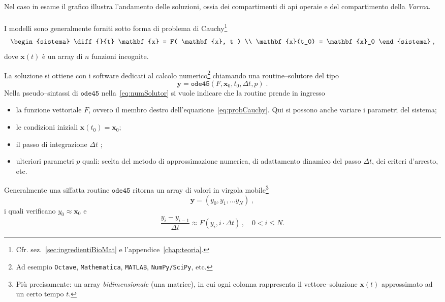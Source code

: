 Nel caso in esame il grafico illustra l'andamento delle soluzioni, ossia dei compartimenti di api operaie e del
compartimento della \emph{Varroa}.

\paragraph{}
I modelli sono generalmente forniti sotto forma di problema di Cauchy\footnote{Cfr. sez.~\ref{sec:ingredientiBioMat} e
l'appendice~\ref{chap:teoria}.}
\begin{equation}
\begin{sistema}
\diff{}{t} \mathbf{x} = F( \mathbf{x}, t )  \\
\mathbf{x}(t_0) = \mathbf{x}_0
\end{sistema}
\; ,
\label{eq:probCauchy}
\end{equation}
dove $\mathbf{x}(t)$ è un array di $n$ funzioni incognite.

La soluzione si ottiene con i software dedicati al calcolo numerico\footnote{Ad esempio \texttt{Octave},
\texttt{Mathematica}, \texttt{MATLAB}, \texttt{NumPy/SciPy}, etc.} chiamando una routine--solutore del tipo
\begin{equation}
\mathbf{y} = \mathtt{ode45} ( F, \mathbf{x}_0, t_0, \Delta t, p) \; .
\label{eq:numSolutor}
\end{equation}
Nella pseudo--sintassi di $\mathtt{ode45}$ nella~\eqref{eq:numSolutor} si vuole indicare che la routine prende in ingresso
\begin{itemize}
    \item la funzione vettoriale $F$, ovvero il membro destro dell'equazione~\eqref{eq:probCauchy}.
        Qui si possono anche variare i parametri del sistema;
    \item le condizioni iniziali $\mathbf{x} (t_0) = \mathbf{x}_0$;
    \item il passo di integrazione $\Delta t$ ;
    \item ulteriori parametri $p$ quali: scelta del metodo di approssimazione numerica, di adattamento dinamico del passo
        $\Delta t$, dei criteri d'arresto, etc.
\end{itemize}
Generalmente una siffatta routine $\mathtt{ode45}$ ritorna un array di valori in virgola mobile\footnote{Più
precisamente: un array \emph{bidimensionale} (una matrice), in cui ogni colonna rappresenta
il vettore--soluzione $\mathbf{x}(t)$ approssimato ad un certo tempo $t$.}
\begin{equation}
\mathbf{y} = \left( y_0, y_1, \dots y_N \right) \; ,
\label{eq:approxSol}
\end{equation}
i quali verificano $y_0 \approx \mathbf{x}_0$ e
$$\frac{y_i - y_{i-1}}{\Delta t} \approx F \left( y_i, i \cdot \Delta t \right) \, , \quad 0 < i \leq N.$$

